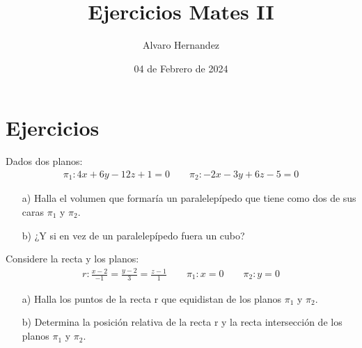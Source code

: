 \documentclass{article}
\title{Ejercicios Mates II}
\author{Alvaro Hernandez}
\date{04 de Febrero de 2024}
\begin{document}
\maketitle




\section{Ejercicios}


 Dados dos planos:
\begin{gather*}
    \pi_1 :  4x + 6y - 12z + 1 = 0 \quad  \quad \pi_2 : -2x - 3y + 6z - 5 = 0
\end{gather*}

\begin{enumerate}
    \setcounter{enumi}{0} %
    \item[a)] Halla el volumen que formaría un paralelepípedo que tiene como dos de sus caras $\pi_1$ y $\pi_2$.
    \item[b)] ¿Y si en vez de un paralelepípedo fuera un cubo?
\end{enumerate}

\quad
\quad
\quad

 Considere la recta y los planos:
\begin{gather*}
    r :  \frac{x-2}{-1} = \frac{y-2}{3} = \frac{z-1}{1}\quad  \quad \pi_1 : x = 0 \quad  \quad \pi_2 : y = 0
\end{gather*}
\begin{enumerate}
    \setcounter{enumi}{0} %
    \item[a)] Halla los puntos de la recta r que equidistan de los planos $\pi_1$ y $\pi_2$.
    \item[b)] Determina la posición relativa de la recta r y la recta intersección de los planos $\pi_1$ y $\pi_2$.
\end{enumerate}
\end{document}
